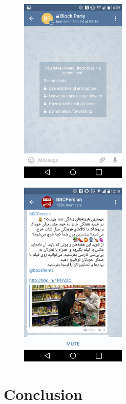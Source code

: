 \documentclass[notoc, symmetric, nobib, nols]{towcenter-guideto-book}
\newcommand{\blankpage}{\newpage\hbox{}\thispagestyle{empty}\newpage}
\begin{document}
\begin{figure}
\includegraphics[width=0.45\textwidth]{graphics/CHATAPPS_Page35_Telegram2.png}
\end{figure}%

\begin{figure}
\includegraphics[width=0.45\textwidth]{graphics/CHATAPPS_Page35_Telegram3.png}
\end{figure}

\chapter{Conclusion}
\blankpage
\end{document}
